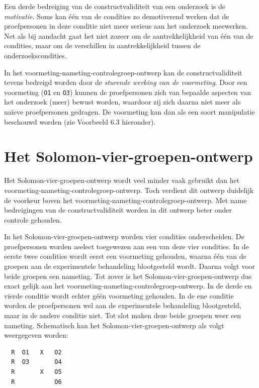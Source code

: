 \documentclass[
]{book}
\begin{document}
Een derde bedreiging van de constructvaliditeit van een onderzoek is de
\emph{motivatie}. Soms kan één van de condities zo demotiverend werken dat de
proefpersonen in deze conditie niet meer serieus aan het onderzoek
meewerken. Net als bij aandacht gaat het niet zozeer om de
aantrekkelijkheid van één van de condities, maar om de verschillen in
aantrekkelijkheid tussen de onderzoekscondities.

In het voormeting-nameting-controlegroep-ontwerp kan de
constructvaliditeit tevens bedreigd worden door de \emph{sturende werking van
de voormeting}. Door een voormeting (\texttt{O1} en \texttt{O3}) kunnen de
proefpersonen zich van bepaalde aspecten van het onderzoek (meer) bewust
worden, waardoor zij zich daarna niet meer als naïeve proefpersonen
gedragen. De voormeting kan dan als een soort manipulatie beschouwd
worden (zie Voorbeeld 6.3 hieronder).

\section{Het Solomon-vier-groepen-ontwerp}\label{sec:solomon-vier-groepen-ontwerp}

Het Solomon-vier-groepen-ontwerp wordt veel minder vaak gebruikt dan het
voormeting-nameting-controlegroep-ontwerp. Toch verdient dit ontwerp
duidelijk de voorkeur boven het
voormeting-nameting-controlegroep-ontwerp. Met name bedreigingen van de
constructvaliditeit worden in dit ontwerp beter onder controle gehouden.

In het Solomon-vier-groepen-ontwerp worden vier condities onderscheiden.
De proefpersonen worden aselect toegewezen aan een van deze vier
condities. In de eerste twee condities wordt eerst een voormeting
gehouden, waarna één van de groepen aan de experimentele behandeling
blootgesteld wordt. Daarna volgt voor beide groepen een nameting. Tot
zover is het Solomon-vier-groepen-ontwerp dus exact gelijk aan het
voormeting-nameting-controlegroep-ontwerp. In de derde en vierde
conditie wordt echter géén voormeting gehouden. In de ene conditie
worden de proefpersonen wel aan de experimentele behandeling
blootgesteld, maar in de andere conditie niet. Tot slot maken deze beide
groepen weer een nameting. Schematisch kan het
Solomon-vier-groepen-ontwerp als volgt weergegeven worden:

\begin{verbatim}
  R  O1   X   O2
  R  O3       O4
  R       X   O5
  R           O6
\end{verbatim}
\end{document}
